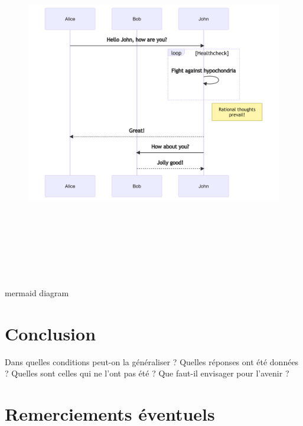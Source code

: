 \documentclass[
  a4paper,
]{scrbook}
\begin{document}
\begin{figure}[H]

{\centering \includegraphics[width=7.81in,height=6.13in]{./resultats_files/figure-latex/mermaid-figure-2.png}

}

\end{figure}

mermaid diagram


\hypertarget{conclusion}{%
\chapter{Conclusion}\label{conclusion}}

Dans quelles conditions peut-on la généraliser ? Quelles réponses ont
été données ? Quelles sont celles qui ne l'ont pas été ? Que faut-il
envisager pour l'avenir ?


\hypertarget{remerciements-uxe9ventuels}{%
\chapter{Remerciements éventuels}\label{remerciements-uxe9ventuels}}
\end{document}
